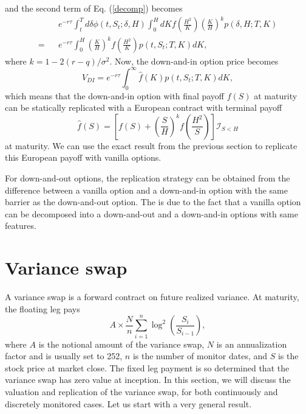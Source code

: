 \documentclass[12pt]{article}
\begin{document}
  and the second term of Eq. (\ref{decomp}) becomes
  \begin{eqnarray}
      &&e^{-r\tau}\int_t^Td\delta \phi(t,S_t;\delta,H)\int_0^HdK f\left(\frac{H^2}{K}\right)\left(\frac{K}{H}\right)^kp\left(\delta,H;T,K\right)\nonumber\\
    = &&e^{-r\tau}\int_0^H \left(\frac{K}{H}\right)^kf\left(\frac{H^2}{K}\right)p\left(t, S_t;T,K\right)dK,
  \end{eqnarray}
  where $k=1-2(r-q)/\sigma^2$. Now, the down-and-in option price becomes
  \begin{equation}
    V_{DI} = e^{-r\tau}\int_0^{\infty} \hat{f}(K)p\left(t, S_t;T,K\right)dK,
  \end{equation}
  which means that the down-and-in option with final payoff $f(S)$ at maturity can be statically replicated with
  a European contract with terminal payoff \cite{CarrChou}
  \begin{equation}
    \hat{f}(S) = \left[f(S) + \left(\frac{S}{H}\right)^kf\left(\frac{H^2}{S}\right)\right]\mathcal{I}_{S<H}
  \end{equation}
  at maturity. We can use the exact result from the previous section to replicate this European payoff with vanilla options.

  For down-and-out options, the replication strategy can be obtained from the difference between a
  vanilla option and a down-and-in option with the same barrier
  as the down-and-out option. The is due to the fact that a vanilla option can be decomposed into a 
  down-and-out and a down-and-in options with same features.

\section{Variance swap}

  A variance swap is a forward contract on future realized variance. At maturity, the floating leg pays
  \begin{equation}
    A\times\frac{N}{n}\sum_{i=1}^{n}\log^2\left(\frac{S_i}{S_{i-1}}\right),
    \label{VarSwapPayoff}
  \end{equation}
  where $A$ is the notional amount of the variance swap, $N$ is an annualization factor and is usually set to
  252, $n$ is the number of monitor dates, and $S$ is the stock price at market close. The fixed leg payment is
  so determined that the variance swap has zero value at inception. In this section, we will discuss the valuation
  and replication of the variance swap, for both continuously and discretely monitored cases. Let us start with
  a very general result.
\end{document}
